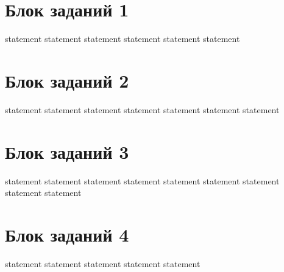 \section{Блок заданий 1}

{statement}
{statement}
{statement}
{statement}
{statement}
{statement}

\section{Блок заданий 2}

{statement}
{statement}
{statement}
{statement}
{statement}
{statement}
{statement}

\section{Блок заданий 3}

{statement}
{statement}
{statement}
{statement}
{statement}
{statement}
{statement}
{statement}
{statement}

\section{Блок заданий 4}

{statement}
{statement}
{statement}
{statement}
{statement}